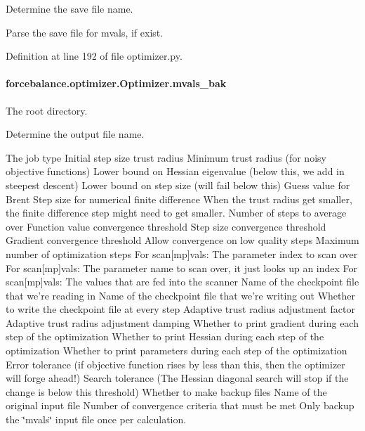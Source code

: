 Determine the save file name.

Parse the save file for mvals, if exist.

Definition at line 192 of file optimizer.\-py.

\hypertarget{classforcebalance_1_1optimizer_1_1Optimizer_a5701ece0fa7290f416ce78bb6d7f012d}{
\paragraph[{mvals\-\_\-bak}]{\setlength{\rightskip}{0pt plus 5cm}forcebalance.\-optimizer.\-Optimizer.\-mvals\-\_\-bak}}\label{classforcebalance_1_1optimizer_1_1Optimizer_a5701ece0fa7290f416ce78bb6d7f012d}


The root directory. 

Determine the output file name.

The job type Initial step size trust radius Minimum trust radius (for noisy objective functions) Lower bound on Hessian eigenvalue (below this, we add in steepest descent) Lower bound on step size (will fail below this) Guess value for Brent Step size for numerical finite difference When the trust radius get smaller, the finite difference step might need to get smaller. Number of steps to average over Function value convergence threshold Step size convergence threshold Gradient convergence threshold Allow convergence on low quality steps Maximum number of optimization steps For scan\mbox{[}mp\mbox{]}vals\-: The parameter index to scan over For scan\mbox{[}mp\mbox{]}vals\-: The parameter name to scan over, it just looks up an index For scan\mbox{[}mp\mbox{]}vals\-: The values that are fed into the scanner Name of the checkpoint file that we're reading in Name of the checkpoint file that we're writing out Whether to write the checkpoint file at every step Adaptive trust radius adjustment factor Adaptive trust radius adjustment damping Whether to print gradient during each step of the optimization Whether to print Hessian during each step of the optimization Whether to print parameters during each step of the optimization Error tolerance (if objective function rises by less than this, then the optimizer will forge ahead!) Search tolerance (The Hessian diagonal search will stop if the change is below this threshold) Whether to make backup files Name of the original input file Number of convergence criteria that must be met Only backup the \char`\"{}mvals\char`\"{} input file once per calculation.


